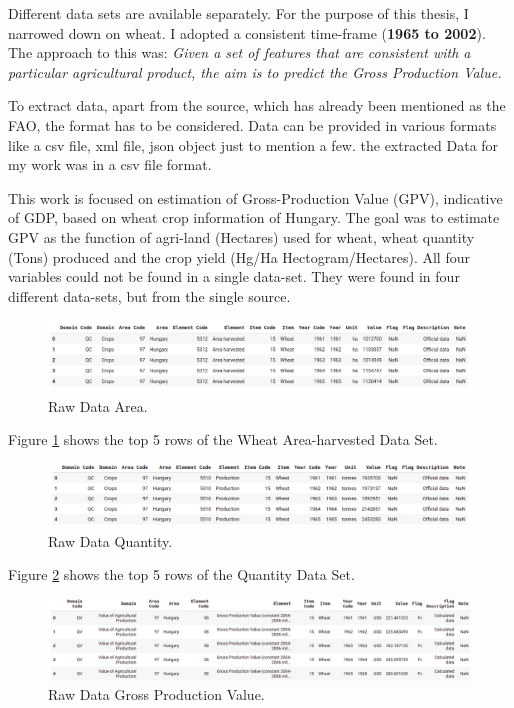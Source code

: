 Different data sets are available separately. For the purpose of this thesis, I narrowed down on wheat. I adopted a consistent time-frame (\textbf{1965 to 2002}). The approach to this was: \textit{Given a set of features that are consistent with a particular agricultural product, the aim is to predict the Gross Production Value.}

To extract data, apart from the source, which has already been mentioned as the FAO, the format has to be considered. Data can be provided in various formats like a csv file, xml file, json object just to mention a few. the extracted Data for my work was in a csv file format. 

This work is focused on estimation of Gross-Production Value (GPV), indicative of GDP, based on wheat crop information of Hungary. The goal was to estimate GPV as the function of agri-land (Hectares) used for wheat, wheat quantity (Tons) produced and the crop yield (Hg/Ha Hectogram/Hectares). All four variables could not be found in a single data-set. They were found in four different data-sets, but from the single source.


\begin{figure}[h!]
	\includegraphics[width=\textwidth,height=\textheight,keepaspectratio]{fig/Area_Head.png}
	\caption{Raw Data Area.}
	\label{fig:Areaa_Head1}
\end{figure}

Figure \ref{fig:Areaa_Head1} shows the top 5 rows of the Wheat Area-harvested Data Set.

\begin{figure}[h!]
	\includegraphics[width=\textwidth,height=\textheight,keepaspectratio]{fig/Quantity_Head.png}
	\caption{Raw Data Quantity.}
	\label{fig:Quantity_Head}
\end{figure}

Figure \ref{fig:Quantity_Head} shows the top 5 rows of the Quantity Data Set.



\begin{figure}[h!]
	\includegraphics[width=\textwidth,height=\textheight,keepaspectratio]{fig/GPV_Head.png}
	\caption{Raw Data Gross Production Value.}
	\label{fig:GPV_Head}
\end{figure}

